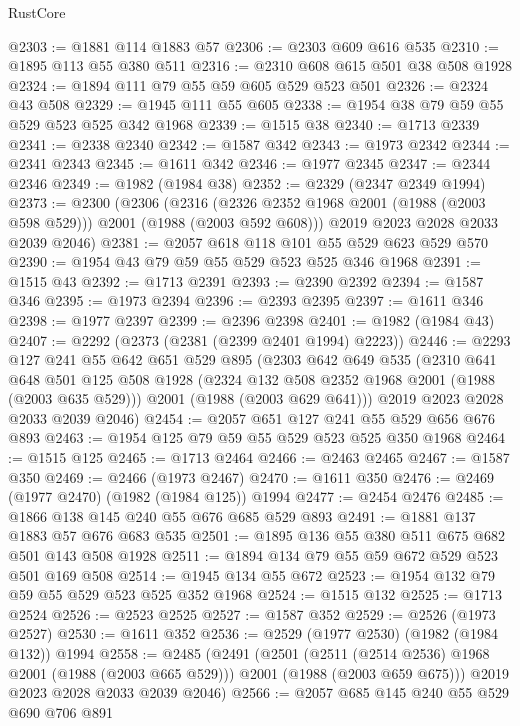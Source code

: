 \begin{lexlean}{RustCore}
\begin{coremodule}
@2303 := @1881 @114 @1883 @57
@2306 := @2303 @609 @616 @535
@2310 := @1895 @113 @55 @380 @511
@2316 := @2310 @608 @615 @501 @38 @508 @1928
@2324 := @1894 @111 @79 @55 @59 @605 @529 @523 @501
@2326 := @2324 @43 @508
@2329 := @1945 @111 @55 @605
@2338 := @1954 @38 @79 @59 @55 @529 @523 @525 @342 @1968
@2339 := @1515 @38
@2340 := @1713 @2339
@2341 := @2338 @2340
@2342 := @1587 @342
@2343 := @1973 @2342
@2344 := @2341 @2343
@2345 := @1611 @342
@2346 := @1977 @2345
@2347 := @2344 @2346
@2349 := @1982 (@1984 @38)
@2352 := @2329 (@2347 @2349 @1994)
@2373 := @2300
    (@2306
      (@2316 (@2326 @2352 @1968 @2001 (@1988 (@2003 @598 @529))) @2001 (@1988 (@2003 @592 @608)))
      @2019
      @2023
      @2028
      @2033
      @2039
      @2046)
@2381 := @2057 @618 @118 @101 @55 @529 @623 @529 @570
@2390 := @1954 @43 @79 @59 @55 @529 @523 @525 @346 @1968
@2391 := @1515 @43
@2392 := @1713 @2391
@2393 := @2390 @2392
@2394 := @1587 @346
@2395 := @1973 @2394
@2396 := @2393 @2395
@2397 := @1611 @346
@2398 := @1977 @2397
@2399 := @2396 @2398
@2401 := @1982 (@1984 @43)
@2407 := @2292 (@2373 (@2381 (@2399 @2401 @1994) @2223))
@2446 := @2293
    @127
    @241
    @55
    @642
    @651
    @529
    @895
    (@2303
      @642
      @649
      @535
      (@2310
        @641
        @648
        @501
        @125
        @508
        @1928
        (@2324 @132 @508 @2352 @1968 @2001 (@1988 (@2003 @635 @529)))
        @2001
        (@1988 (@2003 @629 @641)))
      @2019
      @2023
      @2028
      @2033
      @2039
      @2046)
@2454 := @2057 @651 @127 @241 @55 @529 @656 @676 @893
@2463 := @1954 @125 @79 @59 @55 @529 @523 @525 @350 @1968
@2464 := @1515 @125
@2465 := @1713 @2464
@2466 := @2463 @2465
@2467 := @1587 @350
@2469 := @2466 (@1973 @2467)
@2470 := @1611 @350
@2476 := @2469 (@1977 @2470) (@1982 (@1984 @125)) @1994
@2477 := @2454 @2476
@2485 := @1866 @138 @145 @240 @55 @676 @685 @529 @893
@2491 := @1881 @137 @1883 @57 @676 @683 @535
@2501 := @1895 @136 @55 @380 @511 @675 @682 @501 @143 @508 @1928
@2511 := @1894 @134 @79 @55 @59 @672 @529 @523 @501 @169 @508
@2514 := @1945 @134 @55 @672
@2523 := @1954 @132 @79 @59 @55 @529 @523 @525 @352 @1968
@2524 := @1515 @132
@2525 := @1713 @2524
@2526 := @2523 @2525
@2527 := @1587 @352
@2529 := @2526 (@1973 @2527)
@2530 := @1611 @352
@2536 := @2529 (@1977 @2530) (@1982 (@1984 @132)) @1994
@2558 := @2485
    (@2491
      (@2501
        (@2511 (@2514 @2536) @1968 @2001 (@1988 (@2003 @665 @529)))
        @2001
        (@1988 (@2003 @659 @675)))
      @2019
      @2023
      @2028
      @2033
      @2039
      @2046)
@2566 := @2057 @685 @145 @240 @55 @529 @690 @706 @891

\end{coremodule}
\end{lexlean}
